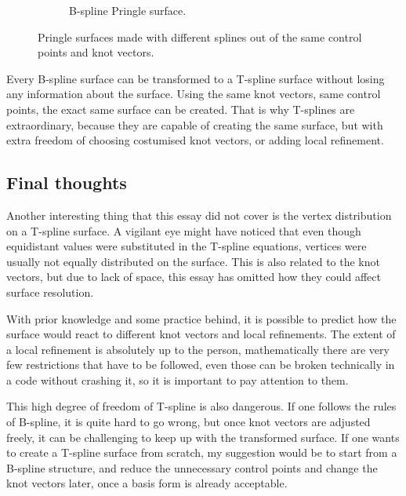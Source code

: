 \documentclass{article}
\begin{document}
\begin{figure}[H]
\begin{subfigure}[b]{0.48\textwidth}
\caption{B-spline Pringle surface.}
\label{pringleb}
\end{subfigure}
\caption{Pringle surfaces made with different splines out of the same control points and knot vectors.}
\label{pringle}
\end{figure}

Every B-spline surface can be transformed to a T-spline surface without losing any information about the surface. Using the same knot vectors, same control points, the exact same surface can be created. That is why T-splines are extraordinary, because they are capable of creating the same surface, but with extra freedom of choosing costumised knot vectors, or adding local refinement.

\vspace{12pt}

\begin{large}
\section{Final thoughts}
\end{large}

\vspace{12pt}

Another interesting thing that this essay did not cover is the vertex distribution on a T-spline surface. A vigilant eye might have noticed that even though equidistant values were substituted in the T-spline equations, vertices were usually not equally distributed on the surface. This is also related to the knot vectors, but due to lack of space, this essay has omitted how they could affect surface resolution.

\vspace{6pt}

With prior knowledge and some practice behind, it is possible to predict how the surface would react to different knot vectors and local refinements. The extent of a local refinement is absolutely up to the person, mathematically there are very few restrictions that have to be followed, even those can be broken technically in a code without crashing it, so it is important to pay attention to them.

This high degree of freedom of T-spline is also dangerous. If one follows the rules of B-spline, it is quite hard to go wrong, but once knot vectors are adjusted freely, it can be challenging to keep up with the transformed surface. If one wants to create a T-spline surface from scratch, my suggestion would be to start from a B-spline structure, and reduce the unnecessary control points and change the knot vectors later, once a basis form is already acceptable.
\end{document}
